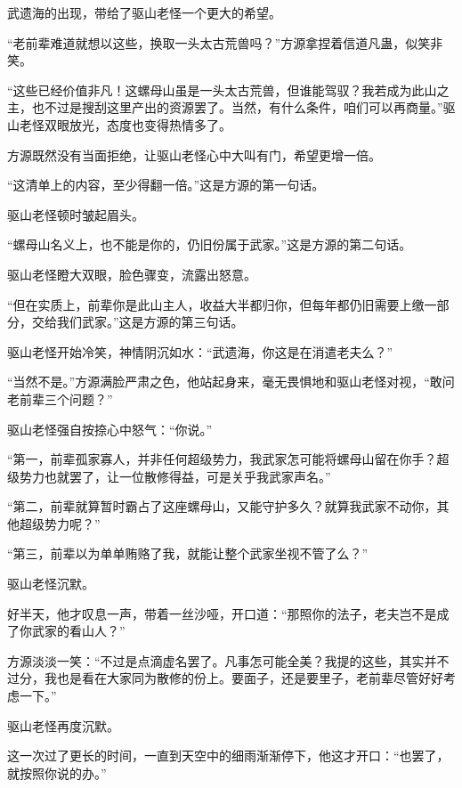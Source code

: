 \begin{this_body}
武遗海的出现，带给了驱山老怪一个更大的希望。

“老前辈难道就想以这些，换取一头太古荒兽吗？”方源拿捏着信道凡蛊，似笑非笑。

“这些已经价值非凡！这螺母山虽是一头太古荒兽，但谁能驾驭？我若成为此山之主，也不过是搜刮这里产出的资源罢了。当然，有什么条件，咱们可以再商量。”驱山老怪双眼放光，态度也变得热情多了。

方源既然没有当面拒绝，让驱山老怪心中大叫有门，希望更增一倍。

“这清单上的内容，至少得翻一倍。”这是方源的第一句话。

驱山老怪顿时皱起眉头。

“螺母山名义上，也不能是你的，仍旧份属于武家。”这是方源的第二句话。

驱山老怪瞪大双眼，脸色骤变，流露出怒意。

“但在实质上，前辈你是此山主人，收益大半都归你，但每年都仍旧需要上缴一部分，交给我们武家。”这是方源的第三句话。

驱山老怪开始冷笑，神情阴沉如水：“武遗海，你这是在消遣老夫么？”

“当然不是。”方源满脸严肃之色，他站起身来，毫无畏惧地和驱山老怪对视，“敢问老前辈三个问题？”

驱山老怪强自按捺心中怒气：“你说。”

“第一，前辈孤家寡人，并非任何超级势力，我武家怎可能将螺母山留在你手？超级势力也就罢了，让一位散修得益，可是关乎我武家声名。”

“第二，前辈就算暂时霸占了这座螺母山，又能守护多久？就算我武家不动你，其他超级势力呢？”

“第三，前辈以为单单贿赂了我，就能让整个武家坐视不管了么？”

驱山老怪沉默。

好半天，他才叹息一声，带着一丝沙哑，开口道：“那照你的法子，老夫岂不是成了你武家的看山人？”

方源淡淡一笑：“不过是点滴虚名罢了。凡事怎可能全美？我提的这些，其实并不过分，我也是看在大家同为散修的份上。要面子，还是要里子，老前辈尽管好好考虑一下。”

驱山老怪再度沉默。

这一次过了更长的时间，一直到天空中的细雨渐渐停下，他这才开口：“也罢了，就按照你说的办。”

\end{this_body}
